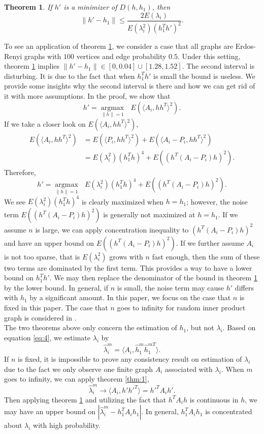 \documentclass[10pt,journal,compsoc]{IEEEtran}
\newtheorem{theorem}{Theorem}[section]
\begin{document}
\begin{theorem}
	\label{thm:2}
	If $h'$ is a minimizer of $D(h,h_1)$, then 
	\[\|h'-h_1\| \leq \frac{2 E(\lambda_i)}{E(\lambda_i^2)(h_1^T h')^2}. \]
\end{theorem}

\noindent	To see an application of theorem \ref{thm:2}, we consider a case that all graphs are Erdos-Renyi graphs with $100$ vertices and edge probability $0.5$. Under this setting, theorem \ref{thm:2} implies  $\|h'-h_1\| \in [0,0.04] \cup [1.28,1.52]$. The second interval is disturbing. It is due to the fact that when $h_1^T h'$ is small the bound is useless. We provide some insights why the second interval is there and how we can get rid of it with more assumptions. In the proof, we show that
\[h'= \underset{\|h\| =1}{\operatorname{argmax}} \text{ } E(\langle A_i,h h^T \rangle ^2). \]
If we take a closer look on $E(\langle A_i,h h^T \rangle ^2)$,
\begin{align*}
	E(\langle A_i,h h^T \rangle ^2) &= E(\langle P_i,h h^T \rangle ^2)+E(\langle A_i-P_i,h h^T \rangle ^2) \\
	&=E(\lambda_i^2)(h_1^T h)^4+E((h^T (A_i-P_i)h) ^2).
\end{align*}
Therefore, 
\[h'= \underset{\|h\| =1}{\operatorname{argmax}} \text{ } E(\lambda_i^2)(h_1^T h)^4+E((h^T (A_i-P_i)h) ^2) .\]
We see $E(\lambda_i^2)(h_1^T h)^4$ is clearly maximized when $h=h_1$; however, the noise term $E((h^T (A_i-P_i)h) ^2)$ is generally not maximized at $h=h_1$. If we assume $n$ is large, we can apply concentration inequality to $(h^T (A_i-P_i)h) ^2$ and have an upper bound on $E((h^T (A_i-P_i)h) ^2)$. If we further assume $A_i$ is not too sparse, that is $E(\lambda_i^2)$ grows with $n$ fast enough, then the sum of these two terms are dominated by the first term. This provides a way to have a lower bound on $h_1^T h'$. We may then replace the denominator of the bound in theorem \ref{thm:2} by the lower bound. In general, if $n$ is small, the noise term may cause $h'$ differs with $h_1$ by a significant amount. In this paper, we focus on the case that $n$ is fixed in this paper. The case that $n$ goes to infinity for random inner product graph is considered in \cite{athreya2013limit}.\\


\noindent The two theorems above only concern the estimation of $h_1$, but not $\lambda_i$. Based on equation \eqref{eq:4}, we estimate $\lambda_i$ by
\[\hat{\lambda}_i^m= \langle A_i,\hat{h}_1^m \hat{h}_1^{m T} \rangle. \]
If $n$ is fixed, it is impossible to prove any consistency result on estimation of $\lambda_i$ due to the fact we only observe one finite graph $A_i$ associated with $\lambda_i$. When $m$ goes to infinity, we can apply theorem \ref{thm:1},
\[\hat{\lambda}_i^m \rightarrow \langle A_i,h' h'^T \rangle = h'^T A_i h'.\]
Then applying theorem \ref{thm:2} and utilizing the fact that $h^T A_i h$ is continuous in $h$, we may have an upper bound on $|\hat{\lambda}_i^m - h_1^T A_i h_1|$. In general, $h_1^T A_i h_1$ is concentrated about $\lambda_i$ with high probability. 
\end{document}
